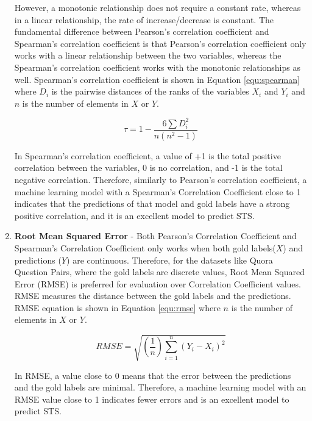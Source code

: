 \begin{enumerate}
	However, a monotonic relationship does not require a constant rate, whereas in a linear relationship, the rate of increase/decrease is constant. The fundamental difference between Pearson's correlation coefficient and Spearman's correlation coefficient is that Pearson's correlation coefficient only works with a linear relationship between the two variables, whereas the Spearman's correlation coefficient works with the monotonic relationships as well. Spearman's correlation coefficient is shown in Equation \ref{equ:spearman} where $D_i$ is the pairwise distances of the ranks of the variables $X_i$ and $Y_i$ and $n$ is the number of elements in $X$ or $Y$.   
	
	
	\begin{equation}
	\label{equ:spearman}
	\tau = 1- {\frac {6 \sum D_i^2}{n(n^2 - 1)}}
	\end{equation}
	
	In Spearman's correlation coefficient, a value of +1 is the total positive correlation between the variables, 0 is no correlation, and -1 is the total negative correlation. Therefore, similarly to Pearson's correlation coefficient, a machine learning model with a Spearman's Correlation Coefficient close to 1 indicates that the predictions of that model and gold labels have a strong positive correlation, and it is an excellent model to predict STS.
	
	\item \textbf{Root Mean Squared Error} - Both Pearson's Correlation Coefficient and Spearman's Correlation Coefficient only works when both gold labels($X$) and predictions ($Y$) are continuous. Therefore, for the datasets like Quora Question Pairs, where the gold labels are discrete values, Root Mean Squared Error (RMSE) is preferred for evaluation over Correlation Coefficient values. RMSE measures the distance between the gold labels and the predictions. RMSE equation is shown in Equation \ref{equ:rmse} where $n$ is the number of elements in $X$ or $Y$. 
	
	\begin{equation}
	\label{equ:rmse}
	RMSE = \sqrt{(\frac{1}{n})\sum_{i=1}^{n}(Y_{i} - X_{i})^{2}}
	\end{equation}

	In RMSE, a value close to 0 means that the error between the predictions and the gold labels are minimal. Therefore, a machine learning model with an RMSE value close to 1 indicates fewer errors and is an excellent model to predict STS.
	
\end{enumerate}


